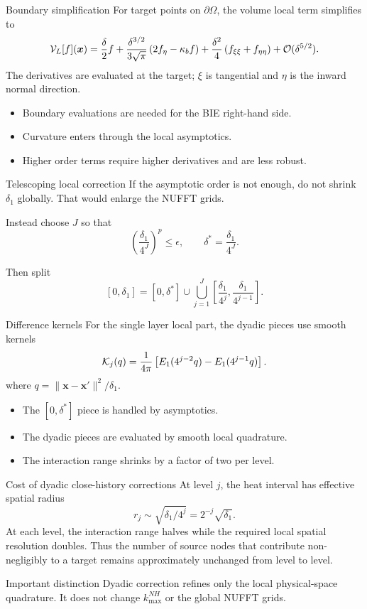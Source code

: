 \documentclass[aspectratio=169,11pt]{beamer}
\newcommand{\cO}{\mathcal{O}}
\newcommand{\x}{\bm{x}}
\newcommand{\xp}{\bm{x}'}
\begin{document}
\begin{frame}{Boundary simplification}
\small
For target points on $\partial\Omega$, the volume local term simplifies to
\[
  \Vop_L[f](\x)
  =
  \frac{\delta}{2}f
  +
  \frac{\delta^{3/2}}{3\sqrt\pi}
  \left(2f_\eta-\kappa_b f\right)
  +
  \frac{\delta^2}{4}\left(f_{\xi\xi}+f_{\eta\eta}\right)
  +
  \cO(\delta^{5/2}).
\]
The derivatives are evaluated at the target; $\xi$ is tangential and $\eta$ is
the inward normal direction.

\begin{itemize}
  \item Boundary evaluations are needed for the BIE right-hand side.
  \item Curvature enters through the local asymptotics.
  \item Higher order terms require higher derivatives and are less robust.
\end{itemize}
\end{frame}

\begin{frame}{Telescoping local correction}
\small
If the asymptotic order is not enough, do not shrink $\delta_1$ globally.
That would enlarge the NUFFT grids.

Instead choose $J$ so that
\[
  \left(\frac{\delta_1}{4^J}\right)^p\le \epsilon,
  \qquad
  \delta^\ast=\frac{\delta_1}{4^J}.
\]

Then split
\[
  [0,\delta_1]
  =
  [0,\delta^\ast]
  \cup
  \bigcup_{j=1}^J
  \left[\frac{\delta_1}{4^j},\frac{\delta_1}{4^{j-1}}\right].
\]
\end{frame}

\begin{frame}{Difference kernels}
\small
For the single layer local part, the dyadic pieces use smooth kernels
\[
  \mathcal{K}_j(q)
  =
  \frac{1}{4\pi}
  \left[
  E_1(4^{j-2}q)-E_1(4^{j-1}q)
  \right].
\]
where $q=\|\x-\xp\|^2/\delta_1$.

\begin{itemize}
  \item The $[0,\delta^\ast]$ piece is handled by asymptotics.
  \item The dyadic pieces are evaluated by smooth local quadrature.
  \item The interaction range shrinks by a factor of two per level.
\end{itemize}
\end{frame}

\begin{frame}{Cost of dyadic close-history corrections}
\small
At level $j$, the heat interval has effective spatial radius
\[
  r_j\sim \sqrt{\delta_1/4^j}=2^{-j}\sqrt{\delta_1}.
\]
At each level, the interaction range halves while the required local spatial
resolution doubles.  Thus the number of source nodes that contribute
non-negligibly to a target remains approximately unchanged from level to level.

\begin{block}{Important distinction}
Dyadic correction refines only the local physical-space quadrature.  It does not
change $k_{\max}^{NH}$ or the global NUFFT grids.
\end{block}
\end{frame}
\end{document}
